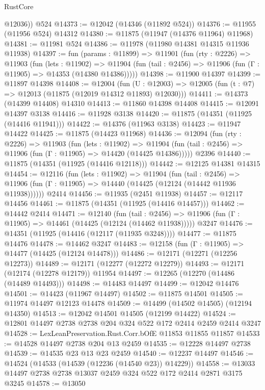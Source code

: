\begin{lexlean}{RustCore}
\begin{coremodule}
        @12036))
    @524
@14373 := @12042 (@14346 (@11892 @524))
@14376 := @11955 (@11956 @524) @14312
@14380 := @11875 (@11947 (@14376 @11964) @11968)
@14381 := @11981 @524
@14386 := @11978 (@11980 @14381 @14315 @11936 @11938)
@14397 := fun (params : @11899) =>
  @11901
    (fun (rty : @2226) =>
    @11903
      (fun (lets : @11902) =>
      @11904 (fun (tail : @2456) => @11906 (fun (Γ : @11905) => @14353 (@14380 @14386)))))
@14398 := @11900 @14397
@14399 := @11897 @14398
@14408 := @12004
    (fun (U : @12003) => @12005 (fun (t : @7) => @12013 (@11875 (@12019 @14312 @11893) @12030)))
@14411 := @14373 (@14399 @14408) @14310
@14413 := @11860 @14398 @14408
@14415 := @12091 @14397 @3138
@14416 := @11928 @3138
@14420 := @11875 (@14351 (@11925 (@14416 @11941)))
@14422 := @14376 (@11963 @3138)
@14423 := @11947 @14422
@14425 := @11875 (@14423 @11968)
@14436 := @12094
    (fun (rty : @2226) =>
    @11903
      (fun (lets : @11902) =>
      @11904 (fun (tail : @2456) => @11906 (fun (Γ : @11905) => @14420 (@14425 @14386)))))
    @2396
@14440 := @11875 (@14351 (@11925 (@14416 @12118)))
@14442 := @12125 @14381 @14315
@14454 := @12116
    (fun (lets : @11902) =>
    @11904
      (fun (tail : @2456) =>
      @11906 (fun (Γ : @11905) => @14440 (@14425 (@12124 (@14442 @11936 @11938))))))
    @2414
@14456 := @11935 (@2451 @11938)
@14457 := @12117 @14456
@14461 := @11875 (@14351 (@11925 (@14416 @14457)))
@14462 := @14442 @2414
@14471 := @12140
    (fun (tail : @2456) => @11906 (fun (Γ : @11905) => @14461 (@14425 (@12124 (@14462 @11938)))))
    @3247
@14476 := @14351 (@11925 (@14416 (@12117 (@11935 @3248))))
@14477 := @11875 @14476
@14478 := @14462 @3247
@14483 := @12158 (fun (Γ : @11905) => @14477 (@14425 (@12124 @14478)))
@14486 := @12171 (@12271 (@12256 @12273))
@14489 := @12171 (@12277 (@12272 @12279))
@14493 := @12171 (@12174 (@12278 @12179)) @11954
@14497 := @12265 (@12270 (@14486 (@14489 @14493)))
@14498 := @14483 @14497
@14499 := @12042 @14476
@14501 := @14423 (@11967 @14497)
@14502 := @11875 @14501
@14505 := @11974 @14497 @12123 @14478
@14509 := @14499 (@14502 @14505) (@12194 @14350)
@14513 := @12042 @14501 @14505 (@12199 @14422)
@14524 := @12801 @14497 @2738 @2738 @204 @324 @522 @172 @2414 @2459 @2414 @3247
@14528 := LexLeanPreservation.Rust.Corr.bOfE @11853 @11855 @11857
@14533 := @14528 @14497 @2738 @204 @13 @2459
@14535 := @12228 @14497 @2738
@14539 := @14535 @23 @13 @23 @2459
@14540 := @12237 @14497
@14546 := @14524 (@14533 (@14539 (@12236 (@14540 @23)) @14229))
@14558 := @13033 @14497 @2738 @2738 @13037 @2459 @324 @522 @172 @2414 @2871 @3175 @3245
@14578 := @13050

\end{coremodule}
\end{lexlean}
